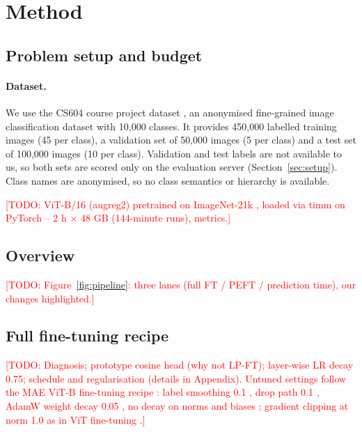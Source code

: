 \documentclass{article} %
\newcommand{\todo}[1]{\textcolor{red}{[TODO: #1]}}
\begin{document}
\section{Method}
\label{sec:method}


\subsection{Problem setup and budget}
\paragraph{Dataset.} We use the CS604 course project dataset \citep{cs604data}, an anonymised
fine-grained image classification dataset with 10,000 classes. It provides 450,000 labelled
training images (45 per class), a validation set of 50,000 images (5 per class) and a test set
of 100,000 images (10 per class). Validation and test labels are not available to us, so both
sets are scored only on the evaluation server (Section~\ref{sec:setup}). Class names are
anonymised, so no class semantics or hierarchy is available.

\todo{ViT-B/16 (augreg2) \citep{steiner2022augreg} pretrained on ImageNet-21k \citep{deng2009imagenet}, loaded via timm \citep{rw2019timm} on PyTorch \citep{paszke2019pytorch} -- 2 h $\times$ 48 GB
(144-minute runs), metrics.}

\subsection{Overview}
\todo{Figure~\ref{fig:pipeline}: three lanes (full FT / PEFT / prediction time),
our changes highlighted.}


\subsection{Full fine-tuning recipe}
\todo{Diagnosis; prototype cosine head \citep{mensink2013ncm,snell2017protonet} (why not LP-FT); layer-wise LR decay 0.75;
schedule and regularisation (details in Appendix). Untuned settings follow the MAE ViT-B fine-tuning recipe
\citep{he2022mae}: label smoothing 0.1 \citep{szegedy2016inception}, drop path 0.1 \citep{huang2016stochdepth},
AdamW weight decay 0.05 \citep{loshchilov2019adamw}, no decay on norms and biases \citep{he2019bagoftricks};
gradient clipping at norm 1.0 as in ViT fine-tuning \citep{dosovitskiy2021vit}.}
\end{document}
